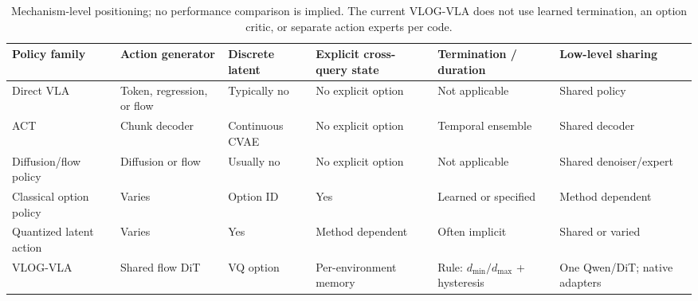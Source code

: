 \begin{table}[t]
\centering
\scriptsize
\setlength{\tabcolsep}{3.5pt}
\begin{tabular}{p{}p{}p{}p{}p{}p{}}
\toprule
Policy family & Action generator & Discrete latent & Explicit cross-query state & Termination / duration & Low-level sharing \\
\midrule
Direct VLA & Token, regression, or flow & Typically no & No explicit option & Not applicable & Shared policy \\
ACT & Chunk decoder & Continuous CVAE & No explicit option & Temporal ensemble & Shared decoder \\
Diffusion/flow policy & Diffusion or flow & Usually no & No explicit option & Not applicable & Shared denoiser/expert \\
Classical option policy & Varies & Option ID & Yes & Learned or specified & Method dependent \\
Quantized latent action & Varies & Yes & Method dependent & Often implicit & Shared or varied \\
VLOG-VLA & Shared flow DiT & VQ option & Per-environment memory & Rule: \(d_{\min}/d_{\max}\) + hysteresis & One Qwen/DiT; native adapters \\
\bottomrule
\end{tabular}
\caption{Mechanism-level positioning; no performance comparison is implied.
The current VLOG-VLA does not use learned termination, an option critic, or
separate action experts per code.}
\label{tab:method-comparison}
\end{table}

